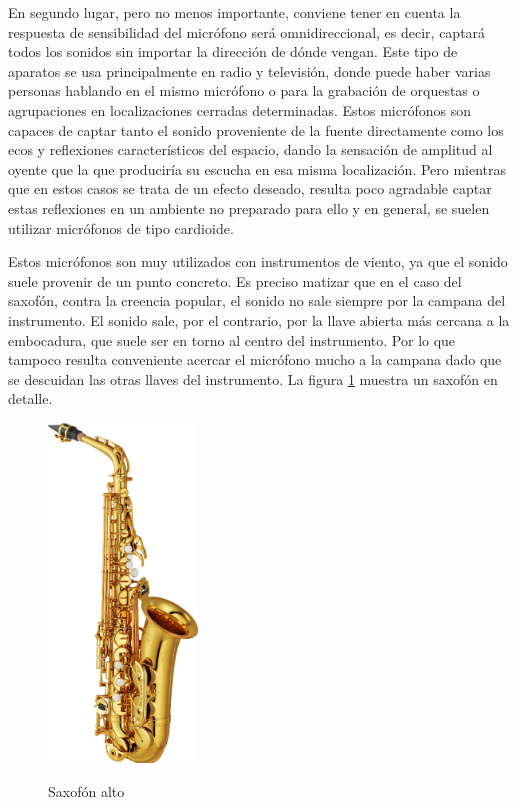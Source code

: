 En segundo lugar, pero no menos importante, conviene tener en cuenta la respuesta de sensibilidad del micrófono será omnidireccional, es decir, captará todos los sonidos sin importar la dirección de dónde vengan. Este tipo de aparatos se usa principalmente en radio y televisión, donde puede haber varias personas hablando en el mismo micrófono o para la grabación de orquestas o agrupaciones en localizaciones cerradas determinadas. Estos micrófonos son capaces de captar tanto el sonido proveniente de la fuente directamente como los ecos y reflexiones característicos del espacio, dando la sensación de amplitud al oyente que la que produciría su escucha en esa misma localización. Pero mientras que en estos casos se trata de un efecto deseado, resulta poco agradable captar estas reflexiones en un ambiente no preparado para ello y en general, se suelen utilizar micrófonos de tipo cardioide.

Estos micrófonos son muy utilizados con instrumentos de viento, ya que el sonido suele provenir de un punto concreto. Es preciso matizar que en el caso del saxofón, contra la creencia popular, el sonido no sale siempre por la campana del instrumento. El sonido sale, por el contrario, por la llave abierta más cercana a la embocadura, que suele ser en torno al centro del instrumento. Por lo que tampoco resulta conveniente acercar el micrófono mucho a la campana dado que se descuidan las otras llaves del instrumento. La figura \ref{fig:saxo} muestra un saxofón en detalle.

\begin{figure}[!b]
\begin{center}
\label{fig:saxo}
\includegraphics[height=9cm]{img/saxo.png}
\caption{Saxofón alto}
\end{center}
\end{figure}
